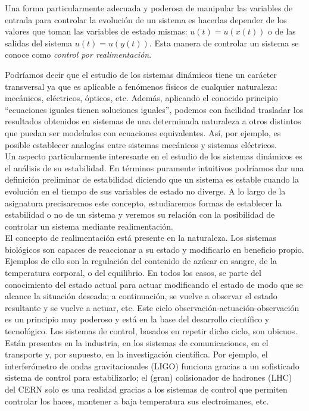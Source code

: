 \begin{enumerate}
Una forma particularmente adecuada y poderosa de manipular las variables de entrada para controlar la evolución de un sistema es hacerlas depender de los valores que toman las variables de estado mismas: $u(t) = u(x(t))$ o de las salidas del sistema $u(t) = u(y(t))$. Esta manera de controlar un sistema se conoce como \emph{control por realimentación}.
\end{enumerate}

Podríamos decir que el estudio de los sistemas dinámicos tiene un carácter transversal ya que es aplicable a fenómenos físicos de cualquier naturaleza: mecánicos, eléctricos, ópticos, etc. Además, aplicando el conocido principio ``ecuaciones iguales tienen soluciones iguales'', podemos  con facilidad trasladar los resultados obtenidos en sistemas de una determinada naturaleza a otros distintos que puedan ser modelados con ecuaciones equivalentes. Así, por ejemplo, es posible establecer analogías entre sistemas mecánicos y sistemas eléctricos.\\

Un aspecto particularmente interesante en el estudio de los sistemas dinámicos es el análisis de su estabilidad. En términos puramente intuitivos podríamos dar una definición preliminar de estabilidad diciendo que un sistema es estable cuando la evolución en el tiempo de sus variables de estado no diverge. A lo largo de la asignatura precisaremos este concepto, estudiaremos formas de establecer la estabilidad o no de un sistema y veremos su relación con la posibilidad de controlar un sistema mediante realimentación.\\

El concepto de realimentación está presente en la naturaleza. Los sistemas biológicos son capaces de reaccionar a su estado y modificarlo en beneficio propio.  Ejemplos de ello son la regulación del contenido de azúcar en sangre, de la temperatura corporal, o del equilibrio. En todos los casos, se parte del conocimiento del estado actual para actuar modificando el estado de modo que se alcance la situación deseada; a continuación, se vuelve a observar el estado resultante y se vuelve a actuar, etc. Este ciclo observación-actuación-observación es un principio muy poderoso y está en la base del desarrollo científico y tecnológico. Los sistemas de control, basados en repetir dicho ciclo, son ubicuos. Están presentes en la industria, en los sistemas de comunicaciones, en el transporte y, por supuesto, en la investigación científica. Por ejemplo, el interferómetro de ondas gravitacionales (LIGO) funciona gracias a un sofisticado sistema de control para estabilizarlo; el (gran) colisionador de hadrones (LHC) del CERN solo es una realidad gracias a los sistemas de control que permiten controlar los haces, mantener a baja temperatura sus electroimanes, etc.\\

